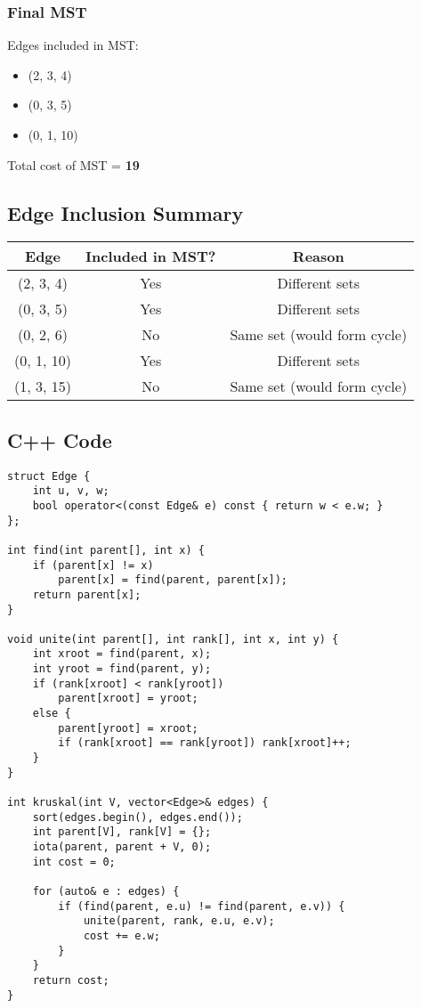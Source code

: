 \documentclass[a4paper,14pt]{extarticle}
\begin{document}
\subsubsection*{Final MST}
Edges included in MST:
\begin{itemize}
    \item (2, 3, 4)
    \item (0, 3, 5)
    \item (0, 1, 10)
\end{itemize}
Total cost of MST = \textbf{19}

\subsection*{Edge Inclusion Summary}
\begin{center}
\begin{tabular}{|c|c|c|}
\hline
\textbf{Edge} & \textbf{Included in MST?} & \textbf{Reason} \\
\hline
(2, 3, 4) & Yes & Different sets \\
(0, 3, 5) & Yes & Different sets \\
(0, 2, 6) & No & Same set (would form cycle) \\
(0, 1, 10) & Yes & Different sets \\
(1, 3, 15) & No & Same set (would form cycle) \\
\hline
\end{tabular}
\end{center}

\newpage
\subsection{C++ Code}
\begin{lstlisting}[style=cpp, caption={Kruskal's Algorithm in C++}]
struct Edge {
    int u, v, w;
    bool operator<(const Edge& e) const { return w < e.w; }
};

int find(int parent[], int x) {
    if (parent[x] != x)
        parent[x] = find(parent, parent[x]);
    return parent[x];
}

void unite(int parent[], int rank[], int x, int y) {
    int xroot = find(parent, x);
    int yroot = find(parent, y);
    if (rank[xroot] < rank[yroot])
        parent[xroot] = yroot;
    else {
        parent[yroot] = xroot;
        if (rank[xroot] == rank[yroot]) rank[xroot]++;
    }
}

int kruskal(int V, vector<Edge>& edges) {
    sort(edges.begin(), edges.end());
    int parent[V], rank[V] = {};
    iota(parent, parent + V, 0);
    int cost = 0;

    for (auto& e : edges) {
        if (find(parent, e.u) != find(parent, e.v)) {
            unite(parent, rank, e.u, e.v);
            cost += e.w;
        }
    }
    return cost;
}
\end{lstlisting}
\end{document}
